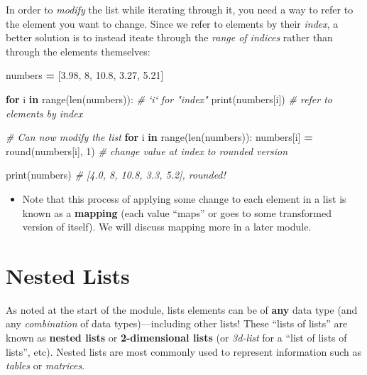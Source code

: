 \documentclass[]{book}
\newenvironment{Shaded}{\begin{snugshade}}{\end{snugshade}}
\newcommand{\KeywordTok}[1]{\textcolor[rgb]{0.13,0.29,0.53}{\textbf{#1}}}
\newcommand{\DecValTok}[1]{\textcolor[rgb]{0.00,0.00,0.81}{#1}}
\newcommand{\FloatTok}[1]{\textcolor[rgb]{0.00,0.00,0.81}{#1}}
\newcommand{\CommentTok}[1]{\textcolor[rgb]{0.56,0.35,0.01}{\textit{#1}}}
\newcommand{\ControlFlowTok}[1]{\textcolor[rgb]{0.13,0.29,0.53}{\textbf{#1}}}
\newcommand{\OperatorTok}[1]{\textcolor[rgb]{0.81,0.36,0.00}{\textbf{#1}}}
\newcommand{\BuiltInTok}[1]{#1}
\newcommand{\NormalTok}[1]{#1}
\providecommand{\tightlist}{%
  \setlength{\itemsep}{0pt}\setlength{\parskip}{0pt}}
\begin{document}
In order to \emph{modify} the list while iterating through it, you need
a way to refer to the element you want to change. Since we refer to
elements by their \emph{index}, a better solution is to instead iteate
through the \emph{range of indices} rather than through the elements
themselves:

\begin{Shaded}
\begin{Highlighting}[]
\NormalTok{numbers }\OperatorTok{=}\NormalTok{ [}\FloatTok{3.98}\NormalTok{, }\DecValTok{8}\NormalTok{, }\FloatTok{10.8}\NormalTok{, }\FloatTok{3.27}\NormalTok{, }\FloatTok{5.21}\NormalTok{]}

\ControlFlowTok{for}\NormalTok{ i }\KeywordTok{in} \BuiltInTok{range}\NormalTok{(}\BuiltInTok{len}\NormalTok{(numbers)):  }\CommentTok{# `i` for "index"}
    \BuiltInTok{print}\NormalTok{(numbers[i])  }\CommentTok{# refer to elements by index}

\CommentTok{# Can now modify the list}
\ControlFlowTok{for}\NormalTok{ i }\KeywordTok{in} \BuiltInTok{range}\NormalTok{(}\BuiltInTok{len}\NormalTok{(numbers)):}
\NormalTok{  numbers[i] }\OperatorTok{=} \BuiltInTok{round}\NormalTok{(numbers[i], }\DecValTok{1}\NormalTok{)  }\CommentTok{# change value at index to rounded version}

\BuiltInTok{print}\NormalTok{(numbers)  }\CommentTok{# [4.0, 8, 10.8, 3.3, 5.2], rounded!}
\end{Highlighting}
\end{Shaded}

\begin{itemize}
\tightlist
\item
  Note that this process of applying some change to each element in a
  list is known as a \textbf{mapping} (each value ``maps'' or goes to
  some transformed version of itself). We will discuss mapping more in a
  later module.
\end{itemize}

\hypertarget{nested-lists}{\section{Nested Lists}\label{nested-lists}}

As noted at the start of the module, lists elements can be of
\textbf{any} data type (and any \emph{combination} of data
types)---including other lists! These ``lists of lists'' are known as
\textbf{nested lists} or \textbf{2-dimensional lists} (or \emph{3d-list}
for a ``list of lists of lists'', etc). Nested lists are most commonly
used to represent information such as \emph{tables} or \emph{matrices}.
\end{document}
